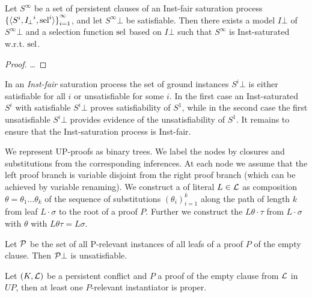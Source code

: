     \begin{lemma}
        Let \( S^\infty \) be a set of persistent clauses
        of an Inst-fair saturation process
        \( {\{ \langle S^i, {I\!_\bot}^i, \operatorname{sel}^i \rangle \}}_{i=1}^\infty \),
        and let \( S^\infty \! \bot \) be satisfiable.
        Then there exists a model \( I \! \bot \) of \( S^\infty \! \bot \)
        and a selection function \( \operatorname{sel} \) based on \( I \! \bot \)
        such that \(S^\infty \) is Inst-saturated w.r.t. \( \operatorname{sel} \).
    \end{lemma}

    \begin{proof} …
    \end{proof}


        In an \emph{Inst-fair} saturation process
        the set of ground instances
        \( S^i \! \bot \) is either satisfiable for all \( i \)
        or unsatisfiable for some \( i \).
        In the first case an Inst-saturated \( S^i \)
        with satisfiable \( S^i \! \bot \) proves satisfiability of \( S^1 \),
        while in the second case the first unsatisfiable \( S^i \! \bot \)
        provides evidence of the unsatisfiability of \( S^1 \).
%
    It remains to ensure that the Inst-saturation process is Inst-fair.


    We represent UP-proofs as binary trees.
    We label the nodes by closures
    and substitutions from the corresponding inferences.
    At each node we assume that the left proof branch
    is variable disjoint from the right proof branch
    (which can be achieved by variable renaming).
    We construct a 
    of literal \( L \in \mathcal{L} \)
    as composition \( \theta = \theta_1\ldots\theta_k \)
    of the sequence of substitutions \( (\theta_i)_{i=1}^k \)
    along the path of length \( k \)
    from leaf \( L\cdot\sigma \)
    to the root of a proof \( P \).
    Further we construct the 
    \( L\theta\cdot\tau \) from
    \( L \cdot \sigma \) with \( \theta \)
    with \( L\theta\tau = L\sigma \).


    \begin{lemma}
        Let \( \mathcal{P} \) be the set of all P-relevant instances
        of all leafs of a proof \( P \) of the empty clause.
        Then \( \mathcal{P} \bot \) is unsatisfiable.
    \end{lemma}

    \begin{corollary}
        Let \( (K, \mathcal{L}) \) be a persistent conflict
        and \( P \) a proof of the empty clause from \( \mathcal{L} \) in \( UP \),
        then at least one \(P\)-relevant instantiator is proper.
    \end{corollary}

